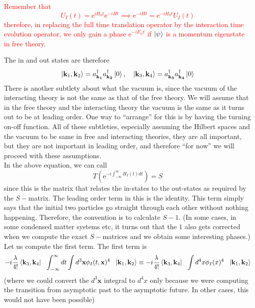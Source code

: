 \documentclass[11pt]{article}
\newcommand{\e}{\mathrm{e}}
\newcommand{\adag}[1]{a^\dagger_\mathbf{#1}}
\numberwithin{equation}{section}
\begin{document}
    \textcolor{red}{
    Remember that 
    \begin{equation*}
        U_I(t) = \e^{iH_0t }\e^{-iHt} \implies \e^{-iHt} = \e^{-iH_0t} U_I(t)
    \end{equation*}
    therefore, in replacing the full time translation operator by the interaction time evolution operator, we only gain a phase \(\e^{-iE_\psi t}\) if \(\ket{\psi}\) is a momentum eigenstate in free theory.\\
    }

    The in and out states are therefore 
    \begin{equation*}
        \ket{\textbf{k}_1, \textbf{k}_2} = \adag{k_1}\adag{k_2}\ket{0},~~~\ket{\textbf{k}_3, \textbf{k}_4} = \adag{k_3}\adag{k_4}\ket{0}
    \end{equation*}
    There is another subtlety about what the vacuum is, since the vacuum of the interacting theory is not the same as that of the free theory. We will assume that in the free theory and the interacting theory the vacuum is the same as it turns out to be at leading order. One way to ``arrange'' for this is by having the turning on-off function. All of these subtleties, especially assuming the Hilbert spaces and the vacuum to be same in free and interacting theories, they are all important, but they are not important in leading order, and therefore ``for now'' we will proceed with these assumptions.\\

    In the above equation, we can call 
    \begin{equation*}
        T\left(\e^{-i\int_{-\infty}^{\infty}H_I(t) dt }\right) = S
    \end{equation*}
    since this is the matrix that relates the in-states to the out-states as required by the \(S-\)matrix. The leading order term in this is the identity. This term simply says that the initial two particles go straight through each other without nothing happening. Therefore, the convention is to calculate \(S-1\). (In some cases, in some condensed matter systems etc, it turns out that the \(1\) also gets corrected when we compute the exact \(S-\)matrices and we obtain some interesting phases.)\\

    Let us compute the first term. The first term is 
    \begin{equation*}
        -i\frac{\lambda}{4!} \bra{\textbf{k}_3, \textbf{k}_4} ~~\int_{-\infty}^{\infty} dt \int d^3\textbf{x} \phi_I(t, \textbf{x})^4~~ \ket{\textbf{k}_1, \textbf{k}_2} \equiv -i\frac{\lambda}{4!} \bra{\textbf{k}_3, \textbf{k}_4} ~~ \int d^4x \phi_I(x)^4~~ \ket{\textbf{k}_1, \textbf{k}_2}
    \end{equation*}
    (where we could convert the \(d^3\textbf{x}\) integral to \(d^4x\) only because we were computing the transition from asymptotic past to the asymptotic future. In other cases, this would not have been possible)\\
\end{document}
